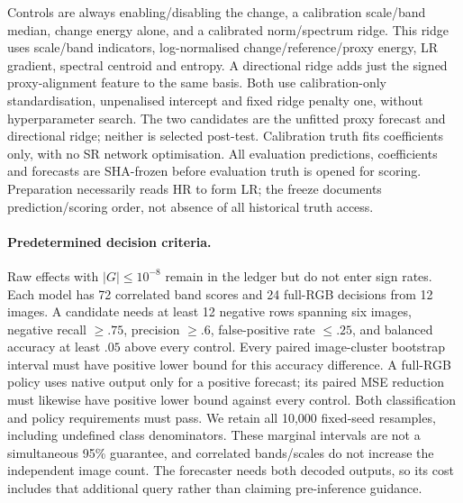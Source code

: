 Controls are always enabling/disabling the change, a calibration scale/band median, change energy alone, and a calibrated norm/spectrum ridge. This ridge uses scale/band indicators, log-normalised change/reference/proxy energy, LR gradient, spectral centroid and entropy. A directional ridge adds just the signed proxy-alignment feature to the same basis. Both use calibration-only standardisation, unpenalised intercept and fixed ridge penalty one, without hyperparameter search. The two candidates are the unfitted proxy forecast and directional ridge; neither is selected post-test. Calibration truth fits coefficients only, with no SR network optimisation. All evaluation predictions, coefficients and forecasts are SHA-frozen before evaluation truth is opened for scoring. Preparation necessarily reads HR to form LR; the freeze documents prediction/scoring order, not absence of all historical truth access.

\paragraph{Predetermined decision criteria.}
Raw effects with $|G|\le10^{-8}$ remain in the ledger but do not enter sign rates. Each model has 72 correlated band scores and 24 full-RGB decisions from 12 images. A candidate needs at least 12 negative rows spanning six images, negative recall $\ge.75$, precision $\ge.6$, false-positive rate $\le.25$, and balanced accuracy at least $.05$ above every control. Every paired image-cluster bootstrap interval must have positive lower bound for this accuracy difference. A full-RGB policy uses native output only for a positive forecast; its paired MSE reduction must likewise have positive lower bound against every control. Both classification and policy requirements must pass. We retain all 10,000 fixed-seed resamples, including undefined class denominators. These marginal intervals are not a simultaneous 95\% guarantee, and correlated bands/scales do not increase the independent image count. The forecaster needs both decoded outputs, so its cost includes that additional query rather than claiming pre-inference guidance.

